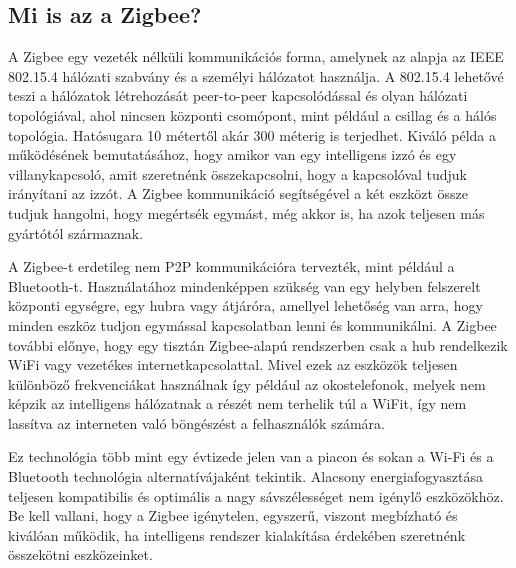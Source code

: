\subsection{Mi is az a Zigbee?}
A Zigbee egy vezeték nélküli kommunikációs forma, amelynek az alapja az IEEE 802.15.4 hálózati szabvány és a személyi hálózatot használja. A 802.15.4 lehetővé teszi a hálózatok létrehozását 
peer-to-peer kapcsolódással és olyan hálózati topológiával, ahol nincsen központi csomópont, mint például a csillag és a hálós topológia. Hatósugara 10 métertől akár 300 méterig is terjedhet.
Kiváló példa a működésének bemutatásához, hogy amikor van egy intelligens izzó és egy villanykapcsoló, amit szeretnénk összekapcsolni, hogy a kapcsolóval tudjuk irányítani az izzót. A Zigbee kommunikáció segítségével a két eszközt össze tudjuk hangolni, hogy megértsék egymást, még akkor is, ha azok teljesen más gyártótól származnak.
\par A Zigbee-t erdetileg nem P2P kommunikációra tervezték, mint például a Bluetooth-t. Használatához mindenképpen szükség van egy helyben felszerelt központi egységre, egy hubra vagy átjáróra, amellyel lehetőség van arra, hogy minden eszköz tudjon egymással kapcsolatban lenni és kommunikálni.
A Zigbee további előnye, hogy egy tisztán Zigbee-alapú rendszerben csak a hub rendelkezik WiFi vagy vezetékes internetkapcsolattal. Mivel ezek az eszközök teljesen különböző frekvenciákat használnak így például az okostelefonok, melyek nem képzik az intelligens hálózatnak a részét nem terhelik túl a WiFit, így nem lassítva az interneten való böngészést a felhasználók számára.
\par Ez technológia több mint egy évtizede jelen van a piacon és sokan a Wi-Fi és a Bluetooth technológia alternatívájaként tekintik. Alacsony energiafogyasztása teljesen kompatibilis és optimális a nagy sávszélességet nem igénylő eszközökhöz.
Be kell vallani, hogy a Zigbee igénytelen, egyszerű, viszont megbízható és kiválóan működik, ha intelligens rendszer kialakítása érdekében szeretnénk összekötni eszközeinket.\cite{4127535}

\subsubsection{}
